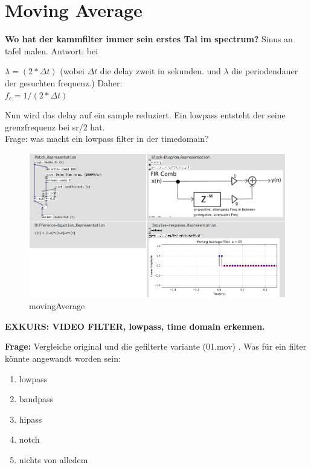 \newpage


\section {Moving Average}

\textbf{Wo hat der kammfilter immer sein erstes Tal im spectrum?}
Sinus an tafel malen.
Antwort:
bei 

\(\lambda =  (2* \Delta t) \)
(wobei \(\Delta t\) die delay zweit in sekunden. und \(\lambda\)  die periodendauer der gesuchten frequenz.) Daher:\\
\(
f_c = 1/(2* \Delta t)
\)

Nun wird das delay auf ein sample reduziert. Ein lowpass entsteht der seine grenzfrequenz bei sr/2 hat.\\

Frage: was macht ein lowpass filter in der timedomain?


\begin{figure}[h]
	\begin{center}
		\includegraphics[width = 14cm]{movingAverage.png}
		\caption{movingAverage}
		\label{fig:movingAverage}
	\end{center}
\end{figure}


\textbf{EXKURS: VIDEO FILTER, lowpass, time domain erkennen.}


\newpage
\textbf{Frage:} Vergleiche original und die gefilterte variante (01.mov) . Was für ein filter könnte angewandt worden sein:
\begin{enumerate}
 	\item lowpass
 	\item bandpass
 	\item hipass
 	\item notch
 	\item nichts von alledem
 \end{enumerate} 


